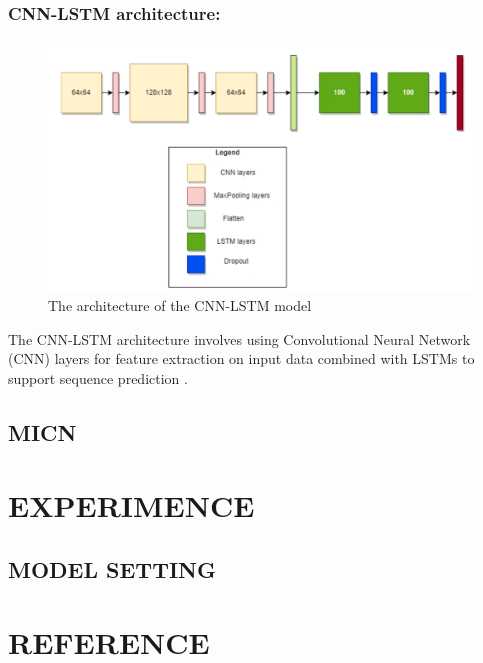 \documentclass[conference]{IEEEtran}
\begin{document}
\subsubsection{CNN-LSTM architecture:}
\begin{figure}[H]
    \centering
    \begin{minipage}{0.8\linewidth}
    \centering
        \includegraphics[width=\linewidth]{images/CNNLSTM_Architechture.png}
    \caption{The architecture of the CNN-LSTM model}
    \label{fig8}
    \end{minipage}
\end{figure}

The CNN-LSTM architecture involves using Convolutional Neural Network (CNN) layers for feature extraction on input data combined with LSTMs to support sequence prediction \cite{PredictStockCNNLSTM}.


\subsection{MICN}


\section{EXPERIMENCE}
\subsection{MODEL SETTING}

\section{REFERENCE}

\printbibliography

\vspace{12pt}
\end{document}
